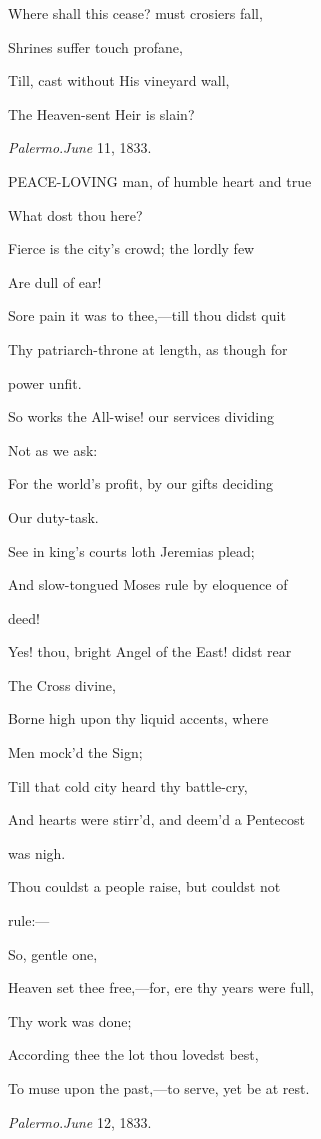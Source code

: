Where shall this cease? must crosiers fall,

Shrines suffer touch profane,

Till, cast without His vineyard wall,

The Heaven-sent Heir is slain?

\emph{Palermo}.\emph{June} 11, 1833.


PEACE-LOVING man, of humble heart and true

What dost thou here?

Fierce is the city's crowd; the lordly few

Are dull of ear!

Sore pain it was to thee,—till thou didst quit

Thy patriarch-throne at length, as though for

power unfit.

So works the All-wise! our services dividing

Not as we ask:

For the world's profit, by our gifts deciding

Our duty-task.

See in king's courts loth Jeremias plead;

And slow-tongued Moses rule by eloquence of

deed! 

Yes! thou, bright Angel of the East! didst rear

The Cross divine,

Borne high upon thy liquid accents, where

Men mock'd the Sign;

Till that cold city heard thy battle-cry,

And hearts were stirr'd, and deem'd a Pentecost

was nigh.

Thou couldst a people raise, but couldst not

rule:—

So, gentle one,

Heaven set thee free,—for, ere thy years were full,

Thy work was done;

According thee the lot thou lovedst best,

To muse upon the past,—to serve, yet be at rest.

\emph{Palermo}.\emph{June} 12, 1833.



